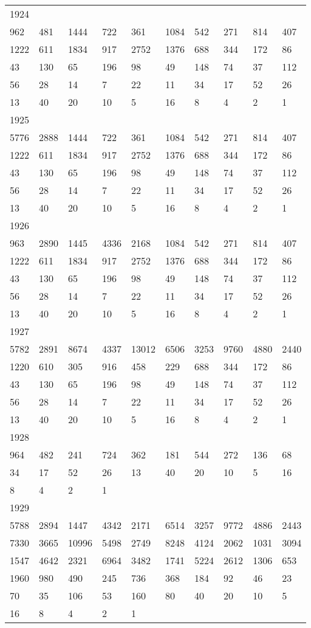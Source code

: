 \begin{longtable}{*{10}{l}}
1924&&&&&&&&&\\
962& 481& 1444& 722& 361& 1084& 542& 271& 814& 407\\
1222& 611& 1834& 917& 2752& 1376& 688& 344& 172& 86\\
43& 130& 65& 196& 98& 49& 148& 74& 37& 112\\
56& 28& 14& 7& 22& 11& 34& 17& 52& 26\\
13& 40& 20& 10& 5& 16& 8& 4& 2& 1\\

1925&&&&&&&&&\\
5776& 2888& 1444& 722& 361& 1084& 542& 271& 814& 407\\
1222& 611& 1834& 917& 2752& 1376& 688& 344& 172& 86\\
43& 130& 65& 196& 98& 49& 148& 74& 37& 112\\
56& 28& 14& 7& 22& 11& 34& 17& 52& 26\\
13& 40& 20& 10& 5& 16& 8& 4& 2& 1\\

1926&&&&&&&&&\\
963& 2890& 1445& 4336& 2168& 1084& 542& 271& 814& 407\\
1222& 611& 1834& 917& 2752& 1376& 688& 344& 172& 86\\
43& 130& 65& 196& 98& 49& 148& 74& 37& 112\\
56& 28& 14& 7& 22& 11& 34& 17& 52& 26\\
13& 40& 20& 10& 5& 16& 8& 4& 2& 1\\

1927&&&&&&&&&\\
5782& 2891& 8674& 4337& 13012& 6506& 3253& 9760& 4880& 2440\\
1220& 610& 305& 916& 458& 229& 688& 344& 172& 86\\
43& 130& 65& 196& 98& 49& 148& 74& 37& 112\\
56& 28& 14& 7& 22& 11& 34& 17& 52& 26\\
13& 40& 20& 10& 5& 16& 8& 4& 2& 1\\

1928&&&&&&&&&\\
964& 482& 241& 724& 362& 181& 544& 272& 136& 68\\
34& 17& 52& 26& 13& 40& 20& 10& 5& 16\\
8& 4& 2& 1& \\

1929&&&&&&&&&\\
5788& 2894& 1447& 4342& 2171& 6514& 3257& 9772& 4886& 2443\\
7330& 3665& 10996& 5498& 2749& 8248& 4124& 2062& 1031& 3094\\
1547& 4642& 2321& 6964& 3482& 1741& 5224& 2612& 1306& 653\\
1960& 980& 490& 245& 736& 368& 184& 92& 46& 23\\
70& 35& 106& 53& 160& 80& 40& 20& 10& 5\\
16& 8& 4& 2& 1& \\


\end{longtable}
